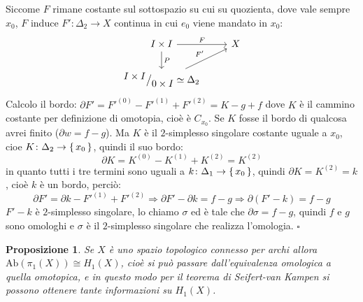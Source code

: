 \documentclass[10pt, twoside=false, x11names]{scrbook}
\newtheorem{proposition}[theorem]{Proposizione}
\newenvironment{proof}{{\textbf{Dimostrazione}:}}{\hfill $\square$}
\newcommand{\Ab}[1]{\mathrm{Ab}\left( #1 \right)}
\newcommand*\quot[2]{{^{\textstyle #1}\big/_{\textstyle #2}}}
\begin{document}
\begin{proof}
  Siccome $ F $ rimane costante sul sottospazio su cui su quozienta,
  dove vale sempre $ x_0 $,
  $ F $ induce $ F' \colon \Delta_2 \to X $ continua in cui $ e_0 $ viene mandato in $ x_0 $:
  \[
    \begin{tikzcd}
      I \times I \arrow{r}{F} \arrow{d}{P} & X \\
      \quot{I \times I}{0 \times I} \simeq \Delta_2 \arrow{ur}{F'}
    \end{tikzcd}
  \]
  Calcolo il bordo: $ \partial F' = F'^{(0)} - F'^{(1)} + F'^{(2)} = K - g + f $
  dove $ K $ è il cammino costante per definizione di omotopia, cioè è $ C_{x_0}$. Se $ K $
  fosse il bordo di qualcosa avrei finito ($ \partial w = f - g $). Ma $ K $ è il $ 2 $-simplesso
  singolare costante uguale a $ x_0 $, cioe $ K \colon \Delta_2 \to \set{x_0} $, quindi il suo bordo:
  \[
    \partial K = K^{(0)} - K^{(1)} + K^{(2)} =  K^{(2)}
  \]
  in quanto tutti i tre termini sono uguali a $ k \colon \Delta_1 \to \set{x_0} $, quindi $ \partial K = K^{(2)} = k $,
  cioè $ k $ è un bordo, perciò:
  \[
    \partial F' = \partial k - F'^{(1)} + F'^{(2)} \Rightarrow \partial F' - \partial k = f - g \Rightarrow \partial(F' - k) = f - g
  \]
  $ F' - k $ è $ 2 $-simplesso singolare, lo chiamo $ \sigma $ ed è tale che $ \partial \sigma = f - g $, quindi
  $ f $ e $ g $ sono omologhi e $ \sigma $ è il $ 2 $-simplesso singolare che realizza
  l'omologia.
\end{proof}

\begin{proposition}
  Se $ X $ è uno spazio topologico connesso per archi allora $ \Ab{\pi_1(X)} \cong H_1(X) $,
  cioè si può passare dall'equivalenza omologica a quella omotopica, e
  in questo modo per il teorema di Seifert-van Kampen si possono ottenere tante
  informazioni su $ H_1(X) $.
\end{proposition}
\end{document}
